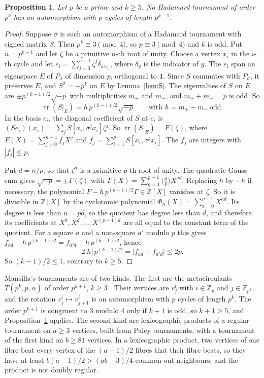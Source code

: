 \documentclass[11pt]{amsart}
\newtheorem{proposition}[theorem]{Proposition}
\theoremstyle{definition}
\theoremstyle{remark}
\newcommand{\Z}{\mathbb{Z}}
\newcommand{\one}{\mathbf{1}}
\newcommand{\tr}{\operatorname{tr}}
\begin{document}
\begin{proposition}\label{prop:metacirculant}
Let $p$ be a prime and $k\ge5$. No Hadamard tournament of order $p^k$ has an automorphism with $p$ cycles of length $p^{k-1}$.
\end{proposition}
\begin{proof}
Suppose $\sigma$ is such an automorphism of a Hadamard tournament with signed matrix $S$. Then $p^k\equiv3\pmod4$, so $p\equiv3\pmod4$ and $k$ is odd. Put $n=p^{k-1}$ and let $\zeta$ be a primitive $n$-th root of unity. Choose a vertex $x_i$ in the $i$-th cycle and let $e_i=\sum_{j=0}^{n-1}\zeta^j\delta_{\sigma^jx_i}$, where $\delta_y$ is the indicator of $y$. The $e_i$ span an eigenspace $E$ of $P_\sigma$ of dimension $p$, orthogonal to $\one$. Since $S$ commutes with $P_\sigma$, it preserves $E$, and $S^2=-p^k$ on $E$ by Lemma~\ref{lem:S}. The eigenvalues of $S$ on $E$ are $\pm p^{(k-1)/2}\sqrt{-p}$ with multiplicities $m_+$ and $m_-$, and $m_++m_-=p$ is odd. So
\[
\tr(S|_E)=h\,p^{(k-1)/2}\sqrt{-p}\qquad\text{with } h=m_+-m_-\ \text{odd}.
\]
In the basis $e_i$, the diagonal coefficient of $S$ at $e_i$ is $(Se_i)(x_i)=\sum_jS[x_i,\sigma^jx_i]\zeta^j$. So $\tr(S|_E)=F(\zeta)$, where $F(X)=\sum_{j=0}^{n-1}f_jX^j$ and $f_j=\sum_{i=1}^pS[x_i,\sigma^jx_i]$. The $f_j$ are integers with $|f_j|\le p$.

Put $d=n/p$, so that $\zeta^d$ is a primitive $p$-th root of unity. The quadratic Gauss sum gives $\sqrt{-p}=\pm\Gamma(\zeta)$ with $\Gamma(X)=\sum_{a=1}^{p-1}\bigl(\frac ap\bigr)X^{ad}$. Replacing $h$ by $-h$ if necessary, the polynomial $F-h\,p^{(k-1)/2}\Gamma\in\Z[X]$ vanishes at $\zeta$. So it is divisible in $\Z[X]$ by the cyclotomic polynomial $\Phi_n(X)=\sum_{a=0}^{p-1}X^{ad}$. Its degree is less than $n=pd$, so the quotient has degree less than $d$, and therefore its coefficients at $X^0,X^d,\dots,X^{(p-1)d}$ are all equal to the constant term of the quotient. For a square $a$ and a non-square $a'$ modulo $p$ this gives $f_{ad}-h\,p^{(k-1)/2}=f_{a'd}+h\,p^{(k-1)/2}$, hence
\[
2|h|\,p^{(k-1)/2}=|f_{ad}-f_{a'd}|\le2p .
\]
So $(k-1)/2\le1$, contrary to $k\ge5$.
\end{proof}

Mansilla's tournaments are of two kinds. The first are the metacirculants $T(p^{k},p,\alpha)$ of order $p^{k+1}$, $k\ge3$ \cite[Section~4, Theorem~9]{Mansilla}. Their vertices are $v^i_j$ with $i\in\Z_p$ and $j\in\Z_{p^k}$, and the rotation $v^i_j\mapsto v^i_{j+1}$ is an automorphism \cite[Proposition~6]{Mansilla} with $p$ cycles of length $p^k$. The order $p^{k+1}$ is congruent to $3$ modulo $4$ only if $k+1$ is odd, so $k+1\ge5$, and Proposition~\ref{prop:metacirculant} applies. The second kind \cite[Theorem~14 and the remark after its proof]{Mansilla} are lexicographic products of a regular tournament on $a\ge3$ vertices, built from Paley tournaments, with a tournament of the first kind on $b\ge81$ vertices. In a lexicographic product, two vertices of one fibre beat every vertex of the $(a-1)/2$ fibres that their fibre beats, so they have at least $b(a-1)/2>(ab-3)/4$ common out-neighbours, and the product is not doubly regular.
\end{document}
